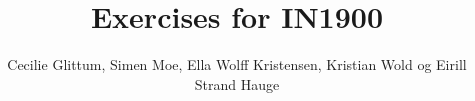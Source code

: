 %
%
%
\documentclass[a4paper, english]{report}


\usepackage{style}
\usepackage{ifikompendiumforside}

%


\title{Exercises for IN1900}
\author{Cecilie Glittum, Simen Moe, Ella Wolff Kristensen, \newline Kristian Wold og Eirill Strand Hauge}


\ififorside


\chapter*{Preface}


\chapter{Computing with Formulas}

\chapter{Loops and Lists}

\chapter{Functions and Branching }

\chapter{User Input and Error Handling}

\chapter{Array Computing and Curve Plotting}

\chapter{Dictionaries and Strings}

\chapter{Introduction to Classes}


